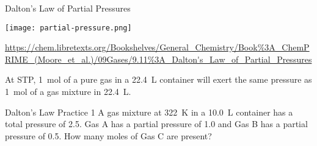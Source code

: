 \documentclass[notes=hide]{beamer}
\begin{document}
\begin{frame}{Dalton's Law of Partial Pressures}
	\begin{center}
		\texttt{[image: partial-pressure.png]}

		\tiny{\url{https://chem.libretexts.org/Bookshelves/General_Chemistry/Book\%3A_ChemPRIME_(Moore_et_al.)/09Gases/9.11\%3A_Dalton's_Law_of_Partial_Pressures}}
	\end{center}

	\bigskip

	At STP, \SI{1}{\mole} of a pure gas in a \SI{22.4}{\liter} container
	will exert the same pressure as \SI{1}{\mole} of a gas mixture in
	\SI{22.4}{\liter}.
\end{frame}

\begin{frame}[t]{Dalton's Law Practice 1}
	A gas mixture at \SI{322}{\kelvin} in a \SI{10.0}{\liter} container
	has a total pressure of \SI{2.5}{\atm}. Gas A has a partial pressure of
	\SI{1.0}{\atm} and Gas B has a partial pressure of \SI{0.5}{\atm}. How
	many moles of Gas C are present?

	\vspace{15em}

\end{frame}

\end{document}
